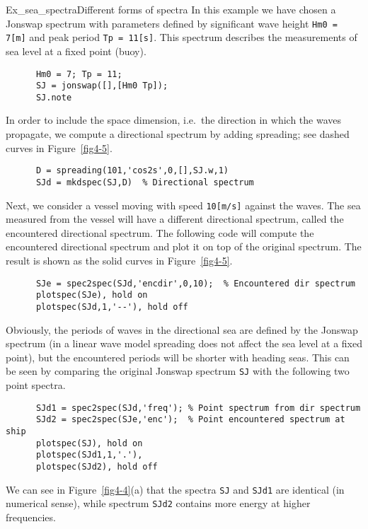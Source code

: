 \begin{rtex}{Ex_sea_spectra}{Different forms of spectra}
In this example we have chosen a {\sc Jonswap} spectrum with parameters
defined by significant wave height {\tt Hm0 = 7[m]} and peak period
{\tt Tp = 11[s]}. This spectrum describes the measurements of sea
level at a fixed point (buoy).
{\small\begin{verbatim}
      Hm0 = 7; Tp = 11;
      SJ = jonswap([],[Hm0 Tp]);
      SJ.note
\end{verbatim}} 

In order to include the space dimension, i.e.\ the direction in which
the waves propagate, we compute a directional spectrum by
adding spreading; see dashed curves in Figure~\ref{fig4-5}.
{\small\begin{verbatim}
      D = spreading(101,'cos2s',0,[],SJ.w,1)
      SJd = mkdspec(SJ,D)  % Directional spectrum
\end{verbatim}}

Next, we consider a vessel moving with
speed {\tt 10[m/s]} against the waves. The sea measured
from the vessel will have a different directional spectrum,
called the encountered  directional spectrum. 
The following code will compute the encountered
directional spectrum and plot it on top of
the original spectrum. The result is shown as
the solid curves in Figure~\ref{fig4-5}.
{\small\begin{verbatim}
      SJe = spec2spec(SJd,'encdir',0,10);  % Encountered dir spectrum
      plotspec(SJe), hold on
      plotspec(SJd,1,'--'), hold off
\end{verbatim}} 

Obviously, the periods of waves in the directional sea are defined by
the {\sc Jonswap} spectrum
(in a linear wave model spreading does not affect the sea level at a fixed point),
but the encountered periods will be shorter with heading seas.
This can be seen by comparing the original {\sc Jonswap} spectrum
\verb+SJ+ with the following two point spectra. 
{\small\begin{verbatim}
      SJd1 = spec2spec(SJd,'freq'); % Point spectrum from dir spectrum
      SJd2 = spec2spec(SJe,'enc');  % Point encountered spectrum at ship
      plotspec(SJ), hold on
      plotspec(SJd1,1,'.'),
      plotspec(SJd2), hold off
\end{verbatim}}
\noindent We can see in Figure~\ref{fig4-4}(a) that the spectra
{\tt SJ} and {\tt SJd1} are identical (in numerical sense),
while spectrum {\tt SJd2} contains more energy at higher frequencies.


\end{rtex}
